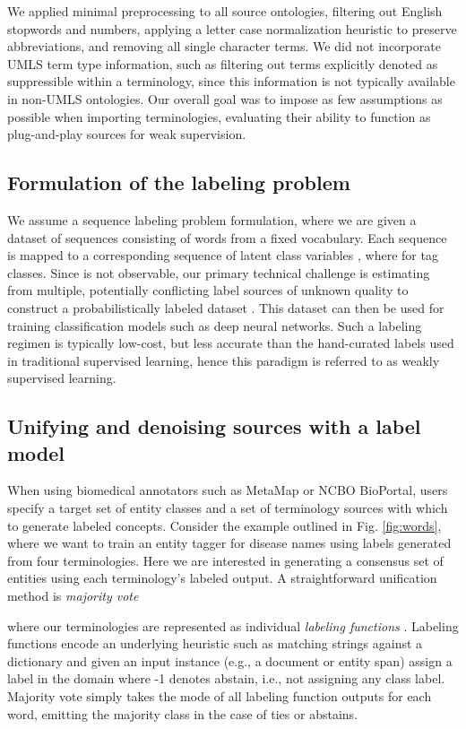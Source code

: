 \documentclass{article}
\begin{document}
We applied minimal preprocessing to all source ontologies, filtering out English stopwords and numbers, applying a letter case normalization heuristic to preserve abbreviations, and removing all single character terms. 
We did not incorporate UMLS term type information, such as filtering out terms explicitly denoted as {suppressible} within a terminology, since this information is not typically available in non-UMLS ontologies.    
Our overall goal was to impose as few assumptions as possible when importing terminologies, evaluating their ability to function as {plug-and-play} sources for weak supervision. 


\subsection*{Formulation of the labeling problem}
\label{sec:algo}

We assume a sequence labeling problem formulation, where we are given a dataset  of  sequences  consisting of words  from a fixed vocabulary.
Each sequence is mapped to a corresponding sequence of latent class variables , where  for  tag classes.
Since  is not observable, our primary technical challenge is estimating  from multiple, potentially conflicting label sources of unknown quality to construct a probabilistically labeled dataset . 
This dataset can then be used for training classification models such as deep neural networks.
Such a labeling regimen is typically low-cost, but less accurate than the hand-curated labels used in traditional supervised learning, hence this paradigm is referred to as weakly supervised learning. 

\subsection*{Unifying and denoising sources with a label model}

When using biomedical annotators such as MetaMap or NCBO BioPortal, users specify a target set of entity classes and a set of terminology sources with which to generate labeled concepts.
Consider the example outlined in Fig. \ref{fig:words}, where we want to train an entity tagger for disease names using labels generated from four terminologies. 
Here we are interested in generating a consensus set of entities using each terminology's labeled output.
A straightforward unification method is \emph{majority vote} 

where our  terminologies are represented as individual \emph{labeling functions} .
Labeling functions encode an underlying heuristic such as matching strings against a dictionary and given an input instance (e.g., a document or entity span) assign a label in the domain  where -1 denotes {abstain}, i.e., not assigning any class label. 
Majority vote simply takes the mode of all labeling function outputs for each word, emitting the majority class in the case of ties or abstains. 
\end{document}
